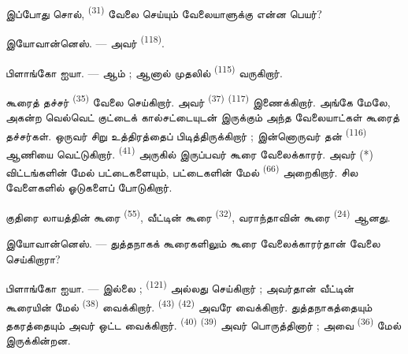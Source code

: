 இப்போது சொல்,  \textsuperscript{(31)} வேலை செய்யும்
வேலையாளுக்கு என்ன பெயர்?

\textsc{இயோவான்னெஸ்}. --- அவர் 
\textsuperscript{(118)}.

\VUsaut{3.0mm}
\VUsaut{3.0mm}

\textsc{பிளாங்கோ ஐயா}. --- ஆம் ; ஆனால் முதலில் 
\textsuperscript{(115)} வருகிறார்.

கூரைத் தச்சர்  \textsuperscript{(35)} வேலை
செய்கிறார். அவர்  \textsuperscript{(37)}
 \textsuperscript{(117)} இணைக்கிறார். அங்கே மேலே,
அகன்ற வெல்வெட் குட்டைக் கால்சட்டையுடன் இருக்கும் அந்த வேலையாட்கள்
கூரைத் தச்சர்கள். ஒருவர் சிறு உத்திரத்தைப் பிடித்திருக்கிறார் ; இன்னொருவர்
தன்  \textsuperscript{(116)} ஆணியை வெட்டுகிறார்.
 \textsuperscript{(41)} அருகில் இருப்பவர் கூரை
வேலைக்காரர். அவர் (*) விட்டங்களின் மேல் பட்டைகளையும், பட்டைகளின் மேல்
 \textsuperscript{(66)} அறைகிறார். சில
வேளைகளில் ஓடுகளைப் போடுகிறார்.


குதிரை லாயத்தின் கூரை  \textsuperscript{(55)},
வீட்டின் கூரை  \textsuperscript{(32)},
வராந்தாவின் கூரை  \textsuperscript{(24)} ஆனது.

\textsc{இயோவான்னெஸ்}. --- துத்தநாகக் கூரைகளிலும் கூரை வேலைக்காரர்தான்
வேலை செய்கிறாரா?

\textsc{பிளாங்கோ ஐயா}. --- இல்லை ; 
\textsuperscript{(121)} அல்லது  செய்கிறார் ;
அவர்தான் வீட்டின் கூரையின் மேல் 
\textsuperscript{(38)} வைக்கிறார். 
\textsuperscript{(43)}  \textsuperscript{(42)}
அவரே வைக்கிறார். துத்தநாகத்தையும் தகரத்தையும் அவர் ஒட்ட வைக்கிறார்.
 \textsuperscript{(40)}  \textsuperscript{(39)} அவர் பொருத்தினார் ; அவை
 \textsuperscript{(36)} மேல் இருக்கின்றன.


